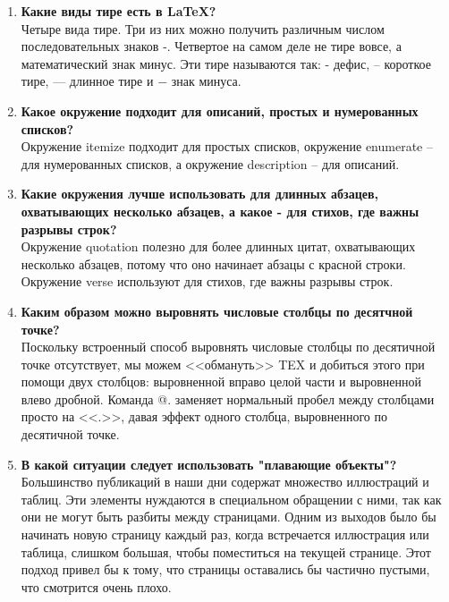 \documentclass[a4paper,12pt]{article} %
\begin{document}
\begin{enumerate}
\item  \textbf{Какие виды тире есть в \LaTeX?}\\

Четыре вида тире. Три из них можно получить различным числом последовательных знаков -. Четвертое на самом деле не тире вовсе, а математический знак минус. Эти тире называются так: - дефис, -- короткое тире, --- длинное тире и $-$ знак минуса.  

\item \textbf{Какое окружение подходит для описаний, простых и нумерованных списков?}\\

Окружение itemize подходит для простых списков, окружение enumerate -- для нумерованных списков, а окружение description -- для описаний.

\item \textbf{Какие окружения лучше использовать для длинных абзацев, охватывающих несколько абзацев, а какое - для стихов, где важны разрывы строк?}\\

Окружение quotation полезно для более длинных цитат, охватывающих несколько абзацев, потому что оно начинает абзацы с красной строки. Окружение verse используют для стихов, где важны разрывы строк. 

\item \textbf{Каким образом можно выровнять числовые столбцы по десятчной точке?}\\

Поскольку встроенный способ выровнять числовые столбцы по десятичной точке отсутствует, мы можем <<обмануть>> TEX и добиться этого при помощи двух столбцов: выровненной вправо целой части и выровненной влево дробной. Команда @{.}  заменяет нормальный пробел между столбцами просто на <<.>>, давая эффект одного столбца, выровненного по десятичной точке. 

\item \textbf{В какой ситуации следует использовать "плавающие объекты"?}\\

Большинство публикаций в наши дни содержат множество иллюстраций и таблиц. Эти элементы нуждаются в специальном обращении с ними, так как они не могут быть разбиты между страницами. Одним из выходов было бы начинать новую страницу каждый раз, когда встречается иллюстрация или таблица, слишком большая, чтобы поместиться на текущей странице. Этот подход привел бы к тому, что страницы оставались бы частично пустыми, что смотрится очень плохо.
\end{enumerate}
\end{document}
